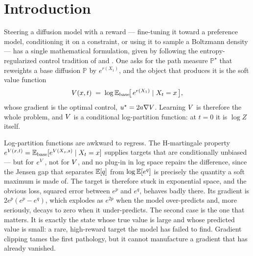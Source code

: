 \section{Introduction}
\label{sec:01_intro}

Steering a diffusion model with a reward --- fine-tuning it toward a preference
model, conditioning it on a constraint, or using it to sample a Boltzmann
density --- has a single mathematical formulation, given by
\citet{uehara2024finetuning} following the entropy-regularized control
tradition of \citet{daipra1991stochastic} and \citet{kappen2005path}. One asks
for the path measure $\mathbb{P}^{\star}$ that reweights a base diffusion
$\mathbb{P}$ by $e^{r(X_1)}$, and the object that produces it is the soft value
function
\begin{equation}
  V(x,t) \;=\; \log\mathbb{E}_{\mathrm{base}}\!\big[\,e^{r(X_1)}\mid X_t=x\,\big],
  \label{eq:intro-value}
\end{equation}
whose gradient is the optimal control, $u^{\star}=2a\nabla V$. Learning $V$
is therefore the whole problem, and $V$ is a conditional log-partition
function: at $t=0$ it is $\log Z$ itself.

Log-partition functions are awkward to regress. The H-martingale property
$e^{V(x,t)}=\mathbb{E}_{\mathrm{base}}[e^{V(X_s,s)}\mid X_t=x]$ supplies targets that are
conditionally unbiased --- but for $e^{V}$, not for $V$, and no plug-in in
log space repairs the difference, since the Jensen gap that separates
$\mathbb{E}[q]$ from $\log\mathbb{E}[e^{q}]$ is precisely the quantity a soft maximum is made
of. The target is therefore stuck in exponential space, and the obvious loss,
squared error between $e^{p}$ and $e^{q}$, behaves badly there. Its gradient is
$2e^{p}(e^{p}-e^{q})$, which explodes as $e^{2p}$ when the model over-predicts
and, more seriously, decays to zero when it under-predicts. The second case is
the one that matters. It is exactly the state whose true value is large and
whose predicted value is small: a rare, high-reward target the model has failed
to find. Gradient clipping tames the first pathology, but it cannot manufacture
a gradient that has already vanished.

